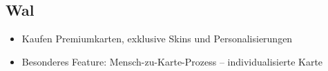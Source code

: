 \documentclass[fontsize=12]{scrartcl}
\begin{document}
	
	
	\subsection{Wal} \label{subsec:Kundensegmente:Wal}
	
	\begin{itemize}
		
		\item Kaufen Premiumkarten, exklusive Skins und Personalisierungen
		
		
		\item Besonderes Feature: \glqq Mensch-zu-Karte-Prozess\grqq{} -- individualisierte Karte
		
	\end{itemize}
	
\end{document}
